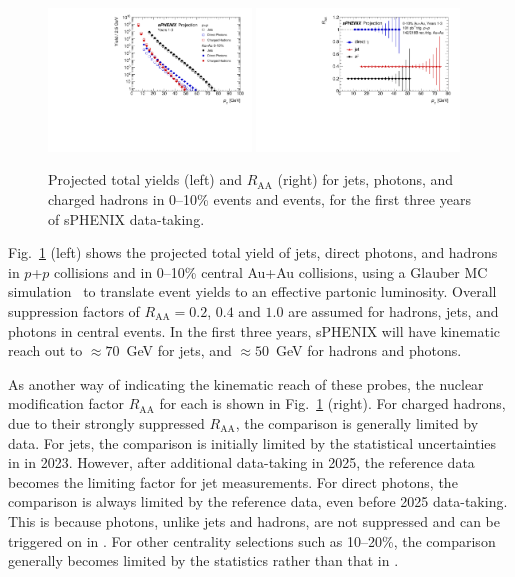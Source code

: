 \begin{figure}[h]
\centering
\includegraphics[width=0.48\textwidth]{figs/master_Years13_yields.pdf}
\includegraphics[width=0.48\textwidth]{figs/RAA_jet_1.pdf}
\caption{Projected total yields (left) and $R_\mathrm{AA}$ (right) for
  jets, photons, and charged hadrons in 0--10\% \auau events and \pp
  events, for the first three years of sPHENIX data-taking.}
\label{fig:jet_RAA_proj}
\end{figure}

Fig.~\ref{fig:jet_RAA_proj} (left) shows the projected total yield of
jets, direct photons, and hadrons in $p$+$p$ collisions and in 0--10\%
central Au+Au collisions, using a Glauber MC
simulation~\cite{Miller:2007ri} to translate \auau event yields to an
effective partonic luminosity. Overall suppression factors of
$R_\mathrm{AA} = 0.2$, $0.4$ and $1.0$ are assumed for hadrons, jets,
and photons in central \auau events. In the first three years, sPHENIX
will have kinematic reach out to $\approx 70$~GeV for jets, and
$\approx 50$~GeV for hadrons and photons.

As another way of indicating the kinematic reach of these probes, the
nuclear modification factor $R_\mathrm{AA}$ for each is shown in
Fig.~\ref{fig:jet_RAA_proj} (right). For charged hadrons, due to their
strongly suppressed $R_\mathrm{AA}$, the comparison is generally
limited by \auau data. For jets, the comparison is initially limited
by the statistical uncertainties in \auau in 2023. However, after
additional \auau data-taking in 2025, the \pp reference data
becomes the limiting factor for jet measurements. For direct photons,
the comparison is always limited by the reference \pp data, even
before 2025 \auau data-taking. This is because photons, unlike jets
and hadrons, are not suppressed and can be triggered on in \auau. For
other centrality selections such as 10--20\%, the comparison generally
becomes limited by the \auau statistics rather than that in \pp.

